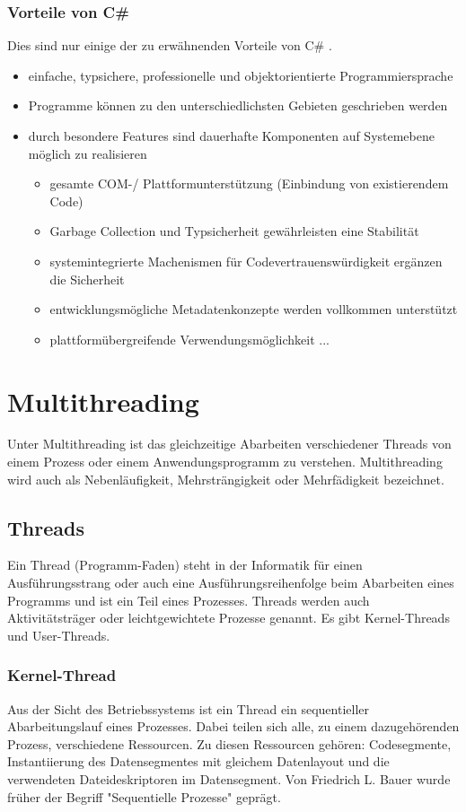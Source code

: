 \documentclass[12pt,a4paper]{report}
\begin{document}
\begin{onehalfspace}
\subsubsection{Vorteile von C\#}
Dies sind nur einige der zu erwähnenden Vorteile von C\# .
\begin{itemize}
\item einfache, typsichere, professionelle und objektorientierte Programmiersprache
\item Programme können zu den unterschiedlichsten Gebieten geschrieben werden
\item durch besondere Features sind dauerhafte Komponenten auf Systemebene möglich zu realisieren
\begin{itemize}
\item gesamte COM-/ Plattformunterstützung (Einbindung von existierendem Code)
\item Garbage Collection und Typsicherheit gewährleisten eine Stabilität
\item systemintegrierte Machenismen für Codevertrauenswürdigkeit ergänzen die Sicherheit
\item entwicklungsmögliche Metadatenkonzepte werden vollkommen unterstützt
\item plattformübergreifende Verwendungsmöglichkeit ...
\end{itemize}
\end{itemize}

\section{Multithreading}
Unter Multithreading ist das gleichzeitige Abarbeiten verschiedener Threads von einem Prozess oder einem Anwendungsprogramm zu verstehen. Multithreading wird auch als Nebenläufigkeit, Mehrsträngigkeit oder Mehrfädigkeit bezeichnet.

\subsection{Threads}\label{ssec:Threads}
Ein Thread (Programm-Faden) steht in der Informatik für einen Ausführungsstrang oder auch eine Ausführungsreihenfolge beim Abarbeiten eines Programms und ist ein Teil eines Prozesses. Threads werden auch Aktivitätsträger oder leichtgewichtete Prozesse genannt. Es gibt Kernel-Threads und User-Threads.

\subsubsection{Kernel-Thread}
Aus der Sicht des Betriebssystems ist ein Thread ein sequentieller Abarbeitungslauf eines Prozesses. Dabei teilen sich alle, zu einem dazugehörenden Prozess, verschiedene Ressourcen. Zu diesen Ressourcen gehören: Codesegmente, Instantiierung des Datensegmentes mit gleichem Datenlayout und die verwendeten Dateideskriptoren im Datensegment. Von Friedrich L. Bauer wurde früher der Begriff "{}Sequentielle Prozesse{}" geprägt.\\


\end{onehalfspace}
\end{document}

